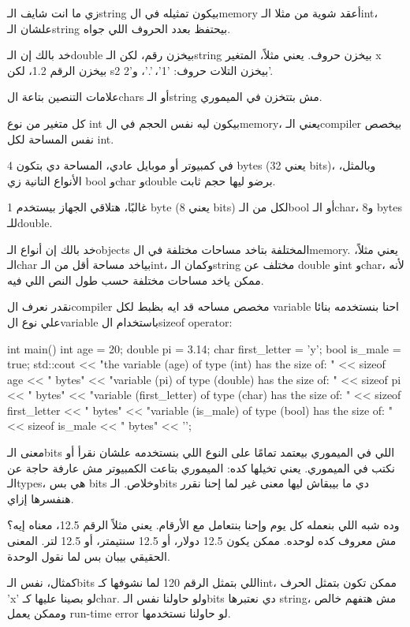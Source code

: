 \documentclass[11pt]{article}
\let\OriginalVerbatim\verbatim
\let\endOriginalVerbatim\endverbatim
\renewenvironment{verbatim}{\begin{english}\OriginalVerbatim}{\endOriginalVerbatim\end{english}}
\begin{document}
زي ما انت شايف الـstring بيكون تمثيله في الmemory أعقد شوية من مثلا الـint، علشان الـstring بيحتفظ بعدد الحروف اللي جواه.

خد بالك إن الـdouble بيخزن رقم، لكن الـstring بيخزن حروف.
يعني مثلاً، المتغير x بيخزن الرقم 1.2، لكن s2 بيخزن التلات حروف: '1'، '.'، و'2'.

علامات التنصين بتاعة الchars أو الـstring مش بتتخزن في الميموري.

كل متغير من نوع int بيكون ليه نفس الحجم في الmemory، يعني الـcompiler بيخصص نفس المساحة لكل int.

في كمبيوتر أو موبايل عادي، المساحة دي بتكون 4 bytes (يعني 32 bits)،
وبالمثل، الأنواع التانية زي bool وchar وdouble برضو ليها حجم ثابت.

غالبًا، هتلاقي الجهاز بيستخدم 1 byte (يعني 8 bits) لكل من الـbool أو الـchar، و8 bytes للـdouble.

خد بالك إن أنواع الـobjects المختلفة بتاخد مساحات مختلفة في الmemory.
يعني مثلاً، الـchar بياخد مساحة أقل من الـint، وكمان الـstring مختلف عن double وint وchar، لأنه ممكن ياخد مساحات مختلفة حسب طول النص اللي فيه.

نقدر نعرف الcompiler مخصص مساحه قد ايه بظبط لكل variable احنا بنستخدمه بنائا علي نوع الvariable باستخدام الsizeof operator:

\begin{verbatim}
int main() {
    int age = 20;
    double pi = 3.14;
    char first_letter = 'y';
    bool is_male = true;
    std::cout << "the variable (age) of type (int) has the size of: " << sizeof age << " bytes"
              << "\nthe variable (pi) of type (double) has the size of: " << sizeof pi << " bytes"
              << "\nthe variable (first_letter) of type (char) has the size of: " << sizeof first_letter << " bytes"
              << "\nthe variable (is_male) of type (bool) has the size of: " << sizeof is_male << " bytes"
              << '\n';
}
\end{verbatim}

معنى الـbits اللي في الميموري بيعتمد تمامًا على النوع اللي بنستخدمه علشان نقرأ أو نكتب في الميموري.
يعني تخيلها كده: الميموري بتاعت الكمبيوتر مش عارفة حاجة عن الـtypes، هي بس bits وخلاص.
الـbits دي ما بيبقاش ليها معنى غير لما إحنا نقرر هنفسرها إزاي.

وده شبه اللي بنعمله كل يوم وإحنا بنتعامل مع الأرقام.
يعني مثلاً الرقم 12.5، معناه إيه؟ مش معروف كده لوحده.
ممكن يكون 12.5 دولار، أو 12.5 سنتيمتر، أو 12.5 لتر.
المعنى الحقيقي بيبان بس لما نقول الوحدة.

كمثال، نفس الـbits اللي بتمثل الرقم 120 لما نشوفها كـint،
ممكن تكون بتمثل الحرف 'x' لو بصينا عليها كـchar.
ولو حاولنا نفس الـbits دي نعتبرها string، مش هتفهم خالص وممكن يعمل run-time error لو حاولنا نستخدمها.
\end{document}

